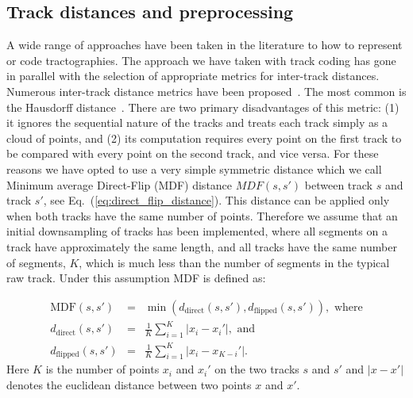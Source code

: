 \documentclass[preprint,authoryear,a4paper,10pt,onecolumn]{elsarticle}
\begin{document}
\subsection{\label{sub:track-distances}Track distances and preprocessing}

A wide range of approaches have been taken in the literature to how to
represent or code tractographies. The approach we have taken with track
coding has gone in parallel with the selection of appropriate metrics
for inter-track distances.  Numerous inter-track distance metrics have
been proposed~\citep{Ding2003, MaddahIPMI2007, zhang2005dti}. The most
common is the Hausdorff distance~\citep[and many other
studies]{corouge2004towards}. There are two primary disadvantages of
this metric: (1) it ignores the sequential nature of the tracks and
treats each track simply as a cloud of points, and (2) its computation
requires every point on the first track to be compared with every point
on the second track, and vice versa. For these reasons we have opted to
use a very simple symmetric distance \citep{EGMB10, Visser2010} which we
call Minimum average Direct-Flip (MDF) distance $MDF(s,s')$ between
track $s$ and track $s'$, see Eq.~(\ref{eq:direct_flip_distance}). This
distance can be applied only when both tracks have the same number of
points. Therefore we assume that an initial downsampling of tracks has
been implemented, where all segments on a track have approximately the
same length, and all tracks have the same number of segments, $K$, which
is much less than the number of segments in the typical raw track. Under
this assumption MDF is defined as:

\begin{eqnarray}
\textrm{MDF}(s,s') & = & \min(d_{\textrm{direct}}(s,s'),d_{\textrm{flipped}}(s,s')),\,\,\textrm{where}\label{eq:direct_flip_distance}\\
d_{\textrm{direct}}(s,s') & = & \frac{1}{K}\sum_{i=1}^{K}|x_{i}-x_{i}'|,\,\,\textrm{and}\nonumber\\
d_{\textrm{flipped}}(s,s') & = & \frac{1}{K}\sum_{i=1}^{K}|x_{i}-x_{K-i}'|.\nonumber
\end{eqnarray}
\noindent
Here $K$ is the number of points $x_{i}$ and $x_{i}'$ on the two tracks $s$ and $s'$
and $|x-x'|$ denotes the euclidean distance between two points $x$ and
$x'$.
\end{document}
